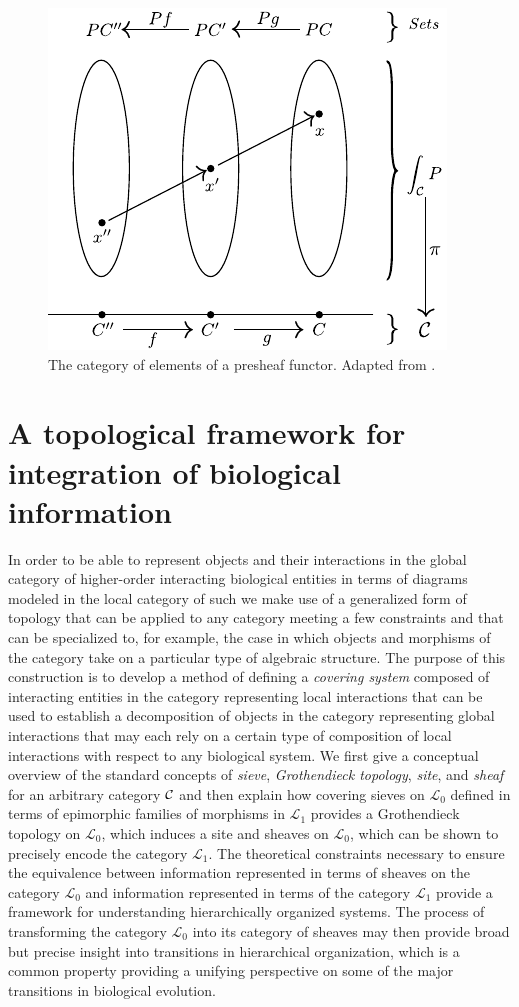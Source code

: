 \documentclass[aps,twocolumn]{revtex4-1}
\begin{document}
\begin{figure}
\noindent\includegraphics[width=0.8\columnwidth]{fig/catofel.pdf}
\caption{The category of elements of a presheaf functor. Adapted from \cite{Awodey2006}.}
\label{fig:catofel}
\end{figure}

\section{A topological framework for integration of biological information}

In order to be able to represent objects and their interactions in the global category of higher-order interacting biological entities in terms of diagrams modeled in the local category of such we make use of a generalized form of topology that can be applied to any category meeting a few constraints and that can be specialized to, for example, the case in which objects and morphisms of the category take on a particular type of algebraic structure. The purpose of this construction is to develop a method of defining a {\it covering system} composed of interacting entities in the category representing local interactions that can be used to establish a decomposition of objects in the category representing global interactions that may each rely on a certain type of composition of local interactions with respect to any biological system. We first give a conceptual overview of the standard concepts of {\it sieve}, {\it Grothendieck topology}, {\it site}, and {\it sheaf} for an arbitrary category ${\mathcal C}$ and then explain how covering sieves on $\mathcal{L}_0$ defined in terms of epimorphic families of morphisms in $\mathcal{L}_1$ provides a Grothendieck topology on $\mathcal{L}_0$, which induces a site and sheaves on $\mathcal{L}_0$, which can be shown to precisely encode the category $\mathcal{L}_1$. The theoretical constraints necessary to ensure the equivalence between information represented in terms of sheaves on the category $\mathcal{L}_0$ and information represented in terms of the category $\mathcal{L}_1$ provide a framework for understanding hierarchically organized systems. The process of transforming the category $\mathcal{L}_0$ into its category of sheaves may then provide broad but precise insight into transitions in hierarchical organization, which is a common property providing a unifying perspective on some of the major transitions in biological evolution.
\end{document}
